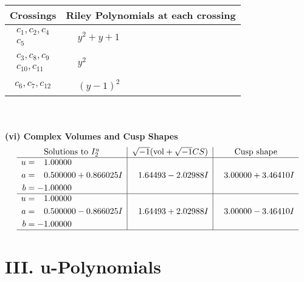 \documentclass[1p]{elsarticle_modified}
\theoremstyle{definition}
\newcommand{\I}{\sqrt{-1}}
\begin{document}
\begin{tabular}{m{50pt}|m{274pt}}
Crossings & \hspace{64pt}Riley Polynomials at each crossing \\
\hline $$\begin{aligned}c_{1},c_{2},c_{4}\\c_{5}\end{aligned}$$&$\begin{aligned}
&y^2+y+1
\end{aligned}$\\
\hline $$\begin{aligned}c_{3},c_{8},c_{9}\\c_{10},c_{11}\end{aligned}$$&$\begin{aligned}
&y^2
\end{aligned}$\\
\hline $$\begin{aligned}c_{6},c_{7},c_{12}\end{aligned}$$&$\begin{aligned}
&(y-1)^2
\end{aligned}$\\
\hline
\end{tabular}\\~\\
\newpage\flushleft \textbf{(vi) Complex Volumes and Cusp Shapes}
$$\begin{array}{c|c|c}  
\text{Solutions to }I^u_{2}& \I (\text{vol} + \sqrt{-1}CS) & \text{Cusp shape}\\
 \hline 
\begin{aligned}
u &= \phantom{-}1.00000\phantom{ +0.000000I} \\
a &= \phantom{-}0.500000 + 0.866025 I \\
b &= -1.00000\phantom{ +0.000000I}\end{aligned}
 & \phantom{-}1.64493 - 2.02988 I & \phantom{-}3.00000 + 3.46410 I \\ \hline\begin{aligned}
u &= \phantom{-}1.00000\phantom{ +0.000000I} \\
a &= \phantom{-}0.500000 - 0.866025 I \\
b &= -1.00000\phantom{ +0.000000I}\end{aligned}
 & \phantom{-}1.64493 + 2.02988 I & \phantom{-}3.00000 - 3.46410 I\\
 \hline 
 \end{array}$$\newpage
\newpage\renewcommand{\arraystretch}{1}
\centering \section*{ III. u-Polynomials}
\end{document}
